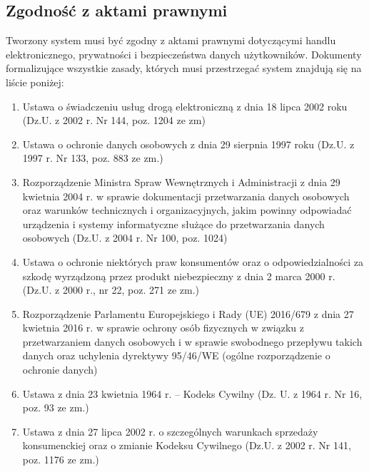 \documentclass[a4paper,20pt]{article}
\begin{document}
\subsection{Zgodność z aktami prawnymi}

Tworzony system musi być zgodny z aktami prawnymi dotyczącymi handlu elektronicznego, prywatności i bezpieczeństwa danych użytkowników. Dokumenty formalizujące wszystkie zasady, których musi przestrzegać system znajdują się na liście poniżej: \\
\begin{enumerate}
\item  Ustawa o świadczeniu usług drogą elektroniczną z dnia 18 lipca 2002 roku (Dz.U. z 2002 r. Nr 144, poz. 1204 ze zm) \\ 
\item  Ustawa o ochronie danych osobowych z dnia 29 sierpnia 1997 roku (Dz.U. z 1997 r. Nr 133, poz. 883 ze zm.) \\
\item  Rozporządzenie Ministra Spraw Wewnętrznych i Administracji z dnia 29 kwietnia 2004 r. w sprawie dokumentacji przetwarzania danych osobowych oraz warunków technicznych i organizacyjnych, jakim powinny odpowiadać urządzenia i systemy informatyczne służące do przetwarzania danych osobowych (Dz.U. z 2004 r. Nr 100, poz. 1024) \\
\item Ustawa o ochronie niektórych praw konsumentów oraz o odpowiedzialności za szkodę wyrządzoną przez produkt niebezpieczny z dnia 2 marca 2000 r. (Dz.U. z 2000 r., nr 22, poz. 271 ze zm.) \\
\item Rozporządzenie Parlamentu Europejskiego i Rady (UE) 2016/679 z dnia 27 kwietnia 2016 r. w sprawie ochrony osób fizycznych w związku z przetwarzaniem danych osobowych i w sprawie swobodnego przepływu takich danych oraz uchylenia dyrektywy 95/46/WE (ogólne rozporządzenie o ochronie danych) \\
\item  Ustawa z dnia 23 kwietnia 1964 r. – Kodeks Cywilny (Dz. U. z 1964 r. Nr 16, poz. 93 ze zm.) \\
\item  Ustawa z dnia 27 lipca 2002 r. o szczególnych warunkach sprzedaży konsumenckiej oraz o zmianie Kodeksu Cywilnego (Dz.U. z 2002 r. Nr 141, poz. 1176 ze zm.)
\end{enumerate}


\newpage
\end{document}
